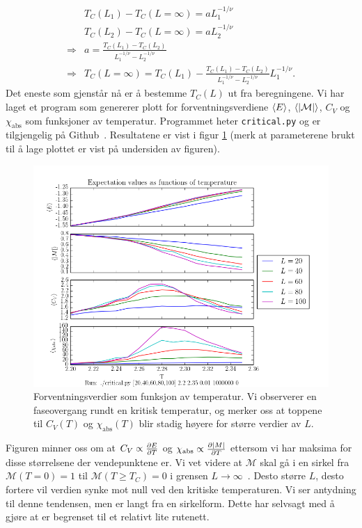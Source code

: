 \documentclass[11pt]{article}
\newcommand{\abs}[1]{|#1|}
\begin{document}
\begin{align}
  &T_C(L_1) - T_C(L=\infty) = aL_1^{-1/\nu}\\
  &T_C(L_2) - T_C(L=\infty) = aL_2^{-1/\nu}\\
\Rightarrow &a = \frac{ T_C(L_1) - T_C(L_2)} {L_1^{-1/\nu} -
  L_2^{-1/\nu}}\\
\Rightarrow &T_C(L=\infty) = T_C(L_1) - \frac{ T_C(L_1) - T_C(L_2)} {L_1^{-1/\nu} -
  L_2^{-1/\nu}}L_1^{-1/\nu}\label{eq:Tc-inf-scale-expression}.
\end{align}
Det eneste som gjenstår nå er å bestemme $T_C(L)$ ut fra
beregningene. Vi har laget et program som genererer plott for
forventningsverdiene $\langle E \rangle$, $\mean{\abs{\mathcal{M}}}$, $C_V$ og
$\chi_\text{abs}$ som funksjoner av temperatur. Programmet heter
\texttt{critical.py} og er tilgjengelig på
Github~\cite{github-repo}. Resultatene er vist i figur \ref{fig:critical-plot} (merk at
parameterene brukt til å lage plottet er vist på undersiden av
figuren). 

\begin{figure}[ht]
  \centering
  \includegraphics[scale=0.7]{../fig/critical.png}
  \caption{\label{fig:critical-plot} Forventningsverdier som funksjon
    av temperatur. Vi observerer en faseovergang rundt en kritisk
    temperatur, og merker oss at toppene til $C_V(T)$ og
    $\chi_\text{abs}(T)$ blir stadig høyere for større verdier av $L$.}
\end{figure}
Figuren minner oss om at $C_V \propto \frac{\partial E}{\partial T}$ og $\chi_\text{abs}
\propto \pd{\abs{M}}{T}$ ettersom vi har maksima for disse størrelsene
der vendepunktene er. Vi vet videre at $\mathcal{M}$ skal gå i
en sirkel fra $\mathcal{M}(T=0)=1$ til $\mathcal{M}(T\geq T_C)=0$ i
grensen $L\rightarrow\infty$~\cite{ising-model-texas-uni}. Desto
større $L$, desto fortere vil verdien synke mot null ved den kritiske
temperaturen. Vi ser antydning til denne tendensen, men er langt fra
en sirkelform. Dette har selvsagt med å gjøre at er begrenset til et
relativt lite rutenett. 
\end{document}
